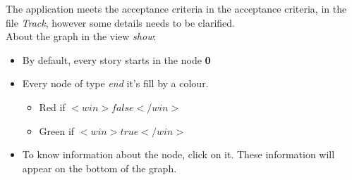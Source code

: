 The application meets the acceptance criteria in the acceptance criteria, in the file \textit{Track}, however some details needs to be clarified.\\
About the graph in the view \textit{show}:
\begin{itemize}
    \item By default, every story starts in the node \textbf{0}
    \item Every node of type \textit{end} it's fill by a colour.
    \begin{itemize}
        \item {\color{red}Red} if \textit{$<win>false</win>$} 
        \item {\color{green}Green} if \textit{$<win>true</win>$}
    \end{itemize}
    \item To know information about the node, click on it. These information will appear on the bottom of the graph.
\end{itemize}